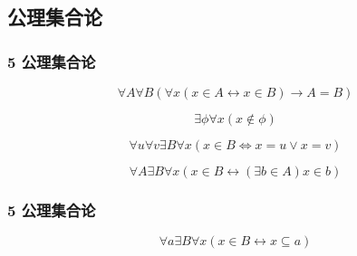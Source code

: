 \documentclass{beamer}
\begin{document}
\begin{CJK*}{UTF8}{gbsn}

\section{公理集合论}
\begin{frame}
  \frametitle{5 公理集合论}
  \begin{Ax}[外延公理]
    \begin{equation*}
      \forall A \forall B (\forall x (x \in A \leftrightarrow x\in B)\rightarrow A = B)
    \end{equation*}
  \end{Ax}
  \begin{Ax}[空集公理]
    \begin{equation*}
      \exists \phi \forall x (x \notin \phi)
    \end{equation*}
  \end{Ax}
  \begin{Ax}[对公理]
    \begin{equation*}
      \forall u \forall v \exists B \forall x (x \in B \Leftrightarrow x = u \lor x = v)
    \end{equation*}
  \end{Ax}
  \begin{Ax}[并集公理]
    \begin{equation*}
     \forall A \exists B \forall x (x \in B \leftrightarrow (\exists b \in A) x \in b)
    \end{equation*}
  \end{Ax}
\end{frame}
\begin{frame}
  \frametitle{5 公理集合论}
    \begin{Ax}[幂集公理]
    \begin{equation*}
      \forall a \exists B \forall x ( x \in B \leftrightarrow x \subseteq a)

\end{equation*}
\end{Ax}
\end{frame}
\end{CJK*}
\end{document}
